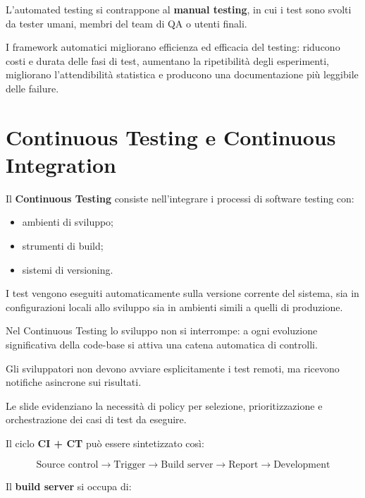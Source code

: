 L'automated testing si contrappone al \textbf{manual testing}, in cui i test sono svolti da tester umani, membri del team di QA o utenti finali.

\begin{notaprof}
I framework automatici migliorano efficienza ed efficacia del testing: riducono costi e durata delle fasi di test, aumentano la ripetibilità degli esperimenti, migliorano l'attendibilità statistica e producono una documentazione più leggibile delle failure.
\end{notaprof}

\section{Continuous Testing e Continuous Integration}

Il \textbf{Continuous Testing} consiste nell'integrare i processi di software testing con:

\begin{itemize}
    \item ambienti di sviluppo;
    \item strumenti di build;
    \item sistemi di versioning.
\end{itemize}

I test vengono eseguiti automaticamente sulla versione corrente del sistema, sia in configurazioni locali allo sviluppo sia in ambienti simili a quelli di produzione.

\begin{notaprof}
Nel Continuous Testing lo sviluppo non si interrompe: a ogni evoluzione significativa della code-base si attiva una catena automatica di controlli.
\end{notaprof}

Gli sviluppatori non devono avviare esplicitamente i test remoti, ma ricevono notifiche asincrone sui risultati.

\begin{notaslide}
Le slide evidenziano la necessità di policy per selezione, prioritizzazione e orchestrazione dei casi di test da eseguire.
\end{notaslide}

Il ciclo \textbf{CI + CT} può essere sintetizzato così:

\[
\text{Source control} \rightarrow \text{Trigger} \rightarrow \text{Build server} \rightarrow \text{Report} \rightarrow \text{Development}
\]

Il \textbf{build server} si occupa di:

